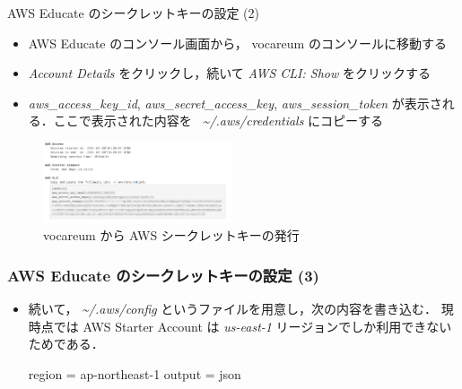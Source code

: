 \documentclass[unicode,11pt]{beamer}
\begin{document}
\begin{frame}{AWS Educate のシークレットキーの設定 (2)}

\begin{itemize}
    \item AWS Educate のコンソール画面から， vocareum のコンソールに移動する
    \item \emph{Account Details} をクリックし，続いて \emph{AWS CLI: Show} をクリックする
    \item \emph{aws\_access\_key\_id}, \emph{aws\_secret\_access\_key}, \emph{aws\_session\_token} が表示される．ここで表示された内容を \emph{~\textasciitilde/.aws/credentials} にコピーする
\end{itemize}

\begin{figure}
    \centering
    \includegraphics[width=0.5\textwidth]{imgs/vocareum_secret.png}
    \caption{vocareum から AWS シークレットキーの発行}
\end{figure}

\end{frame}

\begin{frame}[fragile]
\frametitle{AWS Educate のシークレットキーの設定 (3)}

\begin{itemize}
    \item 続いて， \emph{\textasciitilde/.aws/config} というファイルを用意し，次の内容を書き込む． 現時点では AWS Starter Account は \emph{us-east-1} リージョンでしか利用できないためである．
    
    \begin{semiverbatim}
    region = ap-northeast-1
    output = json
    \end{semiverbatim}
\end{itemize}

\end{frame}
\end{document}
